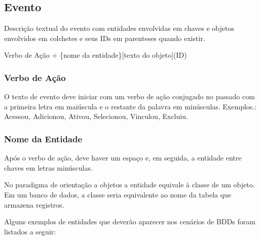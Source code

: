 

\subsection{Evento}
\label{sec-evento}

Descrição textual do evento com entidades envolvidas em chaves e objetos envolvidos em colchetes e seus IDs em parenteses quando existir. 

\begin{center}
 \Large
	Verbo de Ação + \{nome da entidade\}[texto do objeto](ID)
\end{center}

\subsubsection{Verbo de Ação}

O texto de evento deve iniciar com um verbo de ação conjugado no passado com a primeira letra em maiúscula e o restante da palavra em minúsculas. Exemplos.:  Acessou, Adicionou, Ativou, Selecionou, Vinculou, Excluiu.

\subsubsection{Nome da Entidade}
	Após o verbo de ação, deve haver um espaço e, em seguida, a entidade entre chaves em letras minúsculas. 
	
	No paradigma de orientação a objetos a entidade equivale à classe de um objeto. Em um banco de dados, a classe seria equivalente ao nome da tabela que armazena registros.      

	Alguns exemplos de entidades que deverão aparecer nos cenários de BDDs foram listados a seguir:
	
